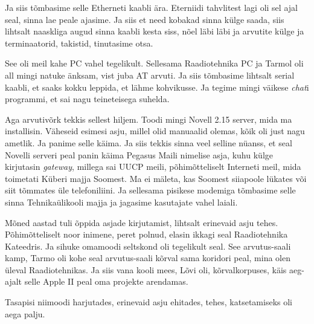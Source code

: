 Ja siis tõmbasime selle Etherneti kaabli ära. Eterniidi tahvlitest lagi oli sel 
ajal seal, sinna lae peale ajasime. Ja siis et need  kobakad sinna külge saada, 
siis lihtsalt naaskliga augud sinna kaabli  kesta siss, nõel läbi läbi ja 
arvutite külge ja terminaatorid, takistid, tinutasime otsa. 


See oli meil kahe PC vahel tegelikult. Sellesama Raadiotehnika PC ja Tarmol oli 
all mingi natuke änksam, vist juba AT arvuti. Ja siis tõmbasime lihtsalt serial 
kaabli, et saaks kokku leppida, et lähme kohvikusse. Ja tegime mingi väikese 
\emph{chat}i programmi, et sai nagu teineteisega suhelda. 

Aga arvutivõrk tekkis sellest hiljem. Toodi mingi Novell 2.15 
server, mida ma installisin. Väheseid esimesi asju, millel olid manuaalid 
olemas, kõik oli just nagu ametlik. Ja panime selle käima. Ja siis tekkis sinna 
veel selline nüanss, et seal Novelli serveri peal panin käima Pegasus 
Maili nimelise asja, kuhu külge kirjutasin \emph{gateway}, 
millega sai UUCP meili, põhimõtteliselt Interneti meil, mida toimetati Küberi 
majja Soomest. Ma ei mäleta, kas Soomest siiapoole lükates või siit tõmmates 
üle telefoniliini. Ja sellesama pisikese modemiga tõmbasime selle sinna 
Tehnikaülikooli majja ja jagasime kasutajate vahel laiali.


Mõned aastad tuli õppida asjade kirjutamist, lihtsalt erinevaid asju tehes. 
Põhimõtteliselt noor inimene, peret polnud, elasin ikkagi seal Raadiotehnika 
Kateedris. Ja sihuke omamoodi seltskond oli tegelikult seal. See arvutus-saali 
kamp, Tarmo oli kohe seal arvutus-saali kõrval sama 
koridori peal, mina olen üleval Raadiotehnikas. Ja siis vana kooli mees, 
Lõvi oli, kõrvalkorpuses, käis aeg-ajalt selle Apple II peal 
oma  projekte arendamas.

Tasapisi niimoodi harjutades, erinevaid asju ehitades, tehes,  katsetamiseks 
oli aega palju.


